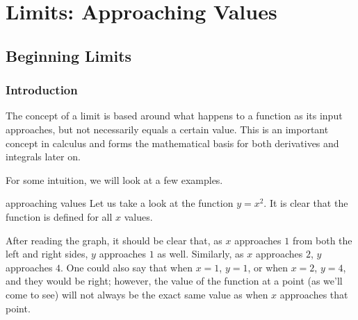 \chapter{Limits: Approaching Values}

\section{Beginning Limits}

\subsection{Introduction}

The concept of a limit is based around what happens to a function as its input approaches, but not necessarily equals a certain value. This is an important concept in calculus and forms the mathematical basis for both derivatives and integrals later on.

For some intuition, we will look at a few examples.

\begin{example}{approaching values}
    Let us take a look at the function \( y = x^2 \). It is clear that the function is defined for all \( x \) values.
    
    \begin{center}
    \end{center}
    
    After reading the graph, it should be clear that, as \( x \) approaches \( 1 \) from both the left and right sides, \( y \) approaches \( 1 \) as well. Similarly, as \( x \) approaches \( 2 \), \( y \) approaches \( 4 \). One could also say that when \( x = 1 \), \( y = 1 \), or when \( x = 2 \), \( y = 4 \), and they would be right; however, the value of the function at a point (as we'll come to see) will not always be the exact same value as when \( x \) approaches that point.
\end{example}

